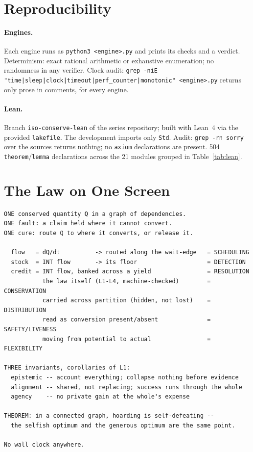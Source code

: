 \documentclass[11pt]{article}
\begin{document}
\section{Reproducibility}
\label{app:repro}

\paragraph{Engines.} Each engine runs as \texttt{python3
<engine>.py} and prints its checks and a verdict. Determinism: exact
rational arithmetic or exhaustive enumeration; no randomness in any
verifier. Clock audit: \texttt{grep -niE
"time|sleep|clock|timeout|perf\_counter|monotonic" <engine>.py}
returns only prose in comments, for every engine.

\paragraph{Lean.} Branch \texttt{iso-conserve-lean} of the series
repository; built with Lean~4 via the provided \texttt{lakefile}. The
development imports only \texttt{Std}. Audit: \texttt{grep -rn sorry}
over the sources returns nothing; no \texttt{axiom} declarations are
present. 504 \texttt{theorem}/\texttt{lemma} declarations across the
21 modules grouped in Table~\ref{tab:lean}.

\section{The Law on One Screen}
\label{app:onescreen}

\begin{verbatim}
ONE conserved quantity Q in a graph of dependencies.
ONE fault: a claim held where it cannot convert.
ONE cure: route Q to where it converts, or release it.

  flow   = dQ/dt          -> routed along the wait-edge   = SCHEDULING
  stock  = INT flow       -> its floor                    = DETECTION
  credit = INT flow, banked across a yield                = RESOLUTION
           the law itself (L1-L4, machine-checked)        = CONSERVATION
           carried across partition (hidden, not lost)    = DISTRIBUTION
           read as conversion present/absent              = SAFETY/LIVENESS
           moving from potential to actual                = FLEXIBILITY

THREE invariants, corollaries of L1:
  epistemic -- account everything; collapse nothing before evidence
  alignment -- shared, not replacing; success runs through the whole
  agency    -- no private gain at the whole's expense

THEOREM: in a connected graph, hoarding is self-defeating --
  the selfish optimum and the generous optimum are the same point.

No wall clock anywhere.
\end{verbatim}
\end{document}
